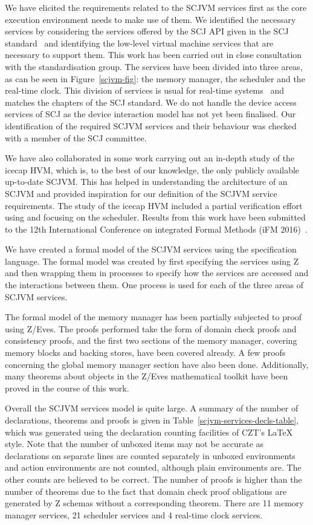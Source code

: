 \documentclass[a4paper,10pt]{report}
\begin{document}
We have elicited the requirements related to the SCJVM services first
as the core execution environment needs to make use of them.
We identified the necessary services by considering the services
offered by the SCJ API given in the SCJ standard~\cite{locke2013} and
identifying the low-level virtual machine services that are necessary
to support them.
This work has been carried out in close consultation with the
standardisation group.
The services have been divided into three areas, as can be seen in
Figure~\ref{scjvm-fig}: the memory manager, the scheduler and the
real-time clock.
This division of services is usual for real-time systems~\cite{li2003}
and matches the chapters of the SCJ standard.
We do not handle the device access services of SCJ as the device
interaction model has not yet been finalised.
Our identification of the required SCJVM services and their behaviour
was checked with a member of the SCJ committee.

We have also collaborated in some work carrying out an in-depth study
of the icecap HVM, which is, to the best of our knowledge, the only
publicly available up-to-date SCJVM.
This has helped in understanding the architecture of an SCJVM and
provided inspiration for our definition of the SCJVM service
requirements.
The study of the icecap HVM included a partial verification effort
using \Circus{} and focusing on the scheduler.
Results from this work have been submitted to the 12th International
Conference on integrated Formal Methods (iFM
2016)~\cite{freitas2016submitted}.

We have created a formal model of the SCJVM services using the
\Circus{} specification language.
The formal model was created by first specifying the services using Z
and then wrapping them in \Circus{} processes to specify how the
services are accessed and the interactions between them.
One \Circus{} process is used for each of the three areas of SCJVM
services.

The formal model of the memory manager has been partially subjected to
proof using Z/Eves.
The proofs performed take the form of domain check proofs and
consistency proofs, and the first two sections of the memory manager,
covering memory blocks and backing stores, have been covered already.
A few proofs concerning the global memory manager section have also
been done.
Additionally, many theorems about objects in the Z/Eves mathematical
toolkit have been proved in the course of this work.

Overall the SCJVM services model is quite large.
A summary of the number of declarations, theorems and proofs is given
in Table~\ref{scjvm-services-decls-table}, which was generated using
the declaration counting facilities of CZT's \LaTeX{} style.
Note that the number of unboxed items may not be accurate as
declarations on separate lines are counted separately in unboxed
environments and \Circus{} action environments are not counted,
although plain \Circus{} environments are.
The other counts are believed to be correct.
The number of proofs is higher than the number of theorems due to the
fact that domain check proof obligations are generated by Z schemas
without a corresponding theorem.
There are 11 memory manager services, 21 scheduler services and 4
real-time clock services.
\end{document}
